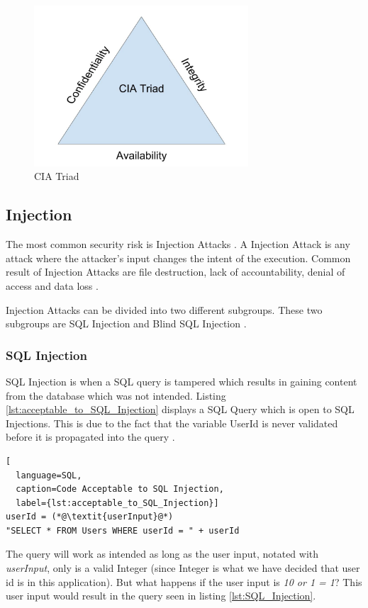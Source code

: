 \begin{figure}
  \centering
  \includegraphics[height=6cm]{images/CIATriad.jpg}
  \caption{CIA Triad}
  \label{fig:CIATriad}
\end{figure}


\subsection{Injection}
The most common security risk is Injection Attacks \parencite{OWASP2017}. A Injection Attack is any attack where the attacker's input changes the intent of the execution. Common result of Injection Attacks are file destruction, lack of accountability, denial of access and data loss \parencite{Secure_Web}.

Injection Attacks can be divided into two different subgroups. These two subgroups are SQL Injection and Blind SQL Injection \parencite{Secure_Web}.


\subsubsection{SQL Injection}
SQL Injection is when a SQL query is tampered which results in gaining content from the database which was not intended. Listing \ref{lst:acceptable_to_SQL_Injection} displays a SQL Query which is open to SQL Injections. This is due to the fact that the variable UserId is never validated before it is propagated into the query \parencite{JustinClarke-Salt2009SIAa, Secure_Web}.

\hfill
\begin{lstlisting}[
  language=SQL,
  caption=Code Acceptable to SQL Injection,
  label={lst:acceptable_to_SQL_Injection}]
userId = (*@\textit{userInput}@*)
"SELECT * FROM Users WHERE userId = " + userId
\end{lstlisting}
\hfill

The query will work as intended as long as the user input, notated with \textit{userInput}, only is a valid Integer (since Integer is what we have decided that user id is in this application). But what happens if the user input is \textit{10 or 1 = 1}? This user input would result in the query seen in listing \ref{lst:SQL_Injection}.

